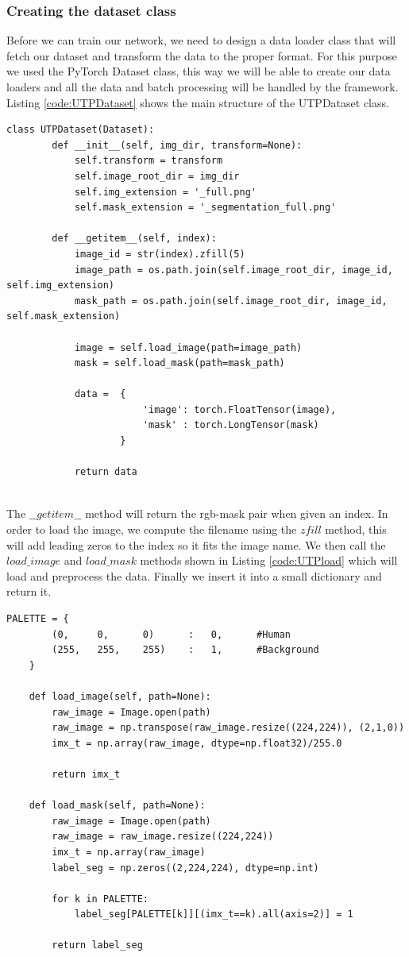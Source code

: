 \subsubsection{Creating the dataset class}
Before we can train our network, we need to design a data loader class that will fetch our dataset and transform the data to the proper format. For this purpose we used the PyTorch Dataset class, this way we will be able to create our data loaders and all the data and batch processing will be handled by the framework. Listing \ref{code:UTPDataset} shows the main structure of the UTPDataset class.

\begin{lstlisting}[style=Python-color, caption=UTPDataset definition, frame=single, label=code:UTPDataset]
	class UTPDataset(Dataset):
		def __init__(self, img_dir, transform=None):
			self.transform = transform
			self.image_root_dir = img_dir
			self.img_extension = '_full.png'
			self.mask_extension = '_segmentation_full.png'
			
		def __getitem__(self, index):
			image_id = str(index).zfill(5)
			image_path = os.path.join(self.image_root_dir, image_id, self.img_extension)
			mask_path = os.path.join(self.image_root_dir, image_id, self.mask_extension)
			
			image = self.load_image(path=image_path)
			mask = self.load_mask(path=mask_path)
			
			data =  {
						'image': torch.FloatTensor(image),
						'mask' : torch.LongTensor(mask)
					}
					
			return data
			
\end{lstlisting}

The \textbf{$\_\_getitem\_\_$} method will return the rgb-mask pair when given an index. In order to load the image, we compute the filename using the $zfill$ method, this will add leading zeros to the index so it fits the image name. We then call the $load\_image$ and $load\_mask$ methods shown in Listing \ref{code:UTPload} which will load and preprocess the data. Finally we insert it into a small dictionary and return it.

\begin{lstlisting}[style=Python-color, caption=UTPDataset rgb and mask load and pre-processing, frame=single, label=code:UTPload]
	PALETTE = {
		(0,		0,		0)		:	0,		#Human
		(255,	255,	255)	:	1,		#Background
	}

	def load_image(self, path=None):
		raw_image = Image.open(path)
		raw_image = np.transpose(raw_image.resize((224,224)), (2,1,0))
		imx_t = np.array(raw_image, dtype=np.float32)/255.0
		
		return imx_t

	def load_mask(self, path=None):
		raw_image = Image.open(path)
		raw_image = raw_image.resize((224,224))
		imx_t = np.array(raw_image)
		label_seg = np.zeros((2,224,224), dtype=np.int)
		
		for k in PALETTE:
			label_seg[PALETTE[k]][(imx_t==k).all(axis=2)] = 1
		
		return label_seg
		
\end{lstlisting}

